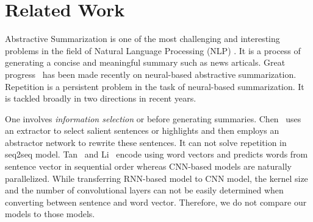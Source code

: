 \section{Related Work}
\label{sec:related}

Abstractive Summarization
is one of the most challenging and interesting problems 
in the field of Natural Language Processing (NLP)
\cite{CareniniC08,PallottaDB09,SankarasubramaniamRG14,BingLLLGP15,RushCW15,LiHZ16,YaoWX17,MohamedO19,LierdeC19,NguyenCNN19}.
It is a process of generating a concise and meaningful summary 
\DIFdelbegin {}\DIFdelend \DIFaddbegin {}\DIFaddend such as news articals.
Great progress~
\cite{RushCW15,ChopraAR16,NallapatiZSGX16,SeeLM17,PaulusXS17,HardyV18,KourisAS19,LiuL19,ZhangWZ19,WangQW19}
has been made recently on
neural-based abstractive summarization.
Repetition is a persistent problem in the task of 
neural-based summarization. 
It is tackled broadly in two directions in recent years. 

One involves {\em information selection} or 
\DIFdelbegin {}\DIFdelend {} \DIFaddend before generating summaries.
Chen~\cite{P18-1063} uses an extractor  
to select salient sentences or highlights and then employs 
an abstractor network to rewrite these sentences.
It can not solve repetition in seq2seq model.
Tan~\cite{TanWX17} and Li~\cite{D18-1205,D18-1441} encode
\DIFdelbegin {}\DIFdelend \DIFaddbegin {}\DIFaddend using word vectors
and predicts words from sentence vector in sequential order 
whereas CNN-based models are naturally parallelized. 
While transferring RNN-based model to CNN model, 
the kernel size and the number of 
convolutional layers can not be easily determined when
converting between sentence and word vector. 
Therefore, we do not compare our models to those models. 


